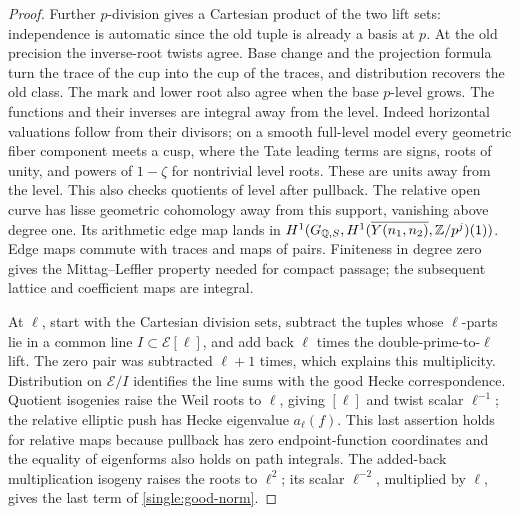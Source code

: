 \begin{proof}
Further \(p\)-division gives a Cartesian product of the two lift sets:
independence is automatic since the old tuple is already a basis at
\(p\).  At the old precision the inverse-root twists agree.  Base
change and the projection formula turn the trace of the cup into
the cup of the traces, and distribution recovers the old class.
The mark and lower root also agree when the base \(p\)-level grows.
The functions and their inverses are integral away from the level.
Indeed horizontal valuations follow from their divisors; on a smooth
full-level model every geometric fiber component meets a cusp, where
the Tate leading terms are signs, roots of unity, and powers of
\(1-\zeta\) for nontrivial level roots.  These are units away from
the level.  This also checks quotients of level after pullback.
The relative open curve has lisse geometric cohomology away from this
support, vanishing above degree one.  Its arithmetic edge map lands in
\(H^1(G_{\mathbb Q,S},H^1(\overline{Y(n_1,n_2)},\mathbb Z/p^j)(1))\).
Edge maps commute with traces and maps of pairs.  Finiteness in degree
zero gives the Mittag--Leffler property needed for compact passage;
the subsequent lattice and coefficient maps are integral.

At \(\ell\), start with the Cartesian division sets, subtract the
tuples whose \(\ell\)-parts lie in a common line \(I\subset\mathcal E[\ell]\),
and add back \(\ell\) times the double-prime-to-\(\ell\) lift.  The zero
pair was subtracted \(\ell+1\) times, which explains this multiplicity.
Distribution on \(\mathcal E/I\) identifies the line sums with the
good Hecke correspondence.  Quotient isogenies raise the Weil roots
to \(\ell\), giving \([\ell]\) and twist scalar \(\ell^{-1}\);
the relative elliptic push has Hecke eigenvalue \(a_\ell(f)\).
This last assertion holds for relative maps because pullback has zero
endpoint-function coordinates and the equality of eigenforms also
holds on path integrals.  The added-back multiplication isogeny raises
the roots to \(\ell^2\); its scalar \(\ell^{-2}\), multiplied by
\(\ell\), gives the last term of \eqref{single:good-norm}.


\end{proof}
